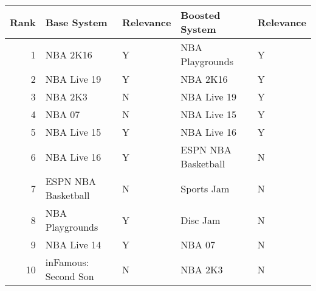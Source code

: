 \begin{tabular}{rllll}
\toprule
 Rank &          Base System & Relevance &      Boosted System & Relevance \\
\midrule
    1 &             NBA 2K16 &         Y &     NBA Playgrounds &         Y \\
    2 &          NBA Live 19 &         Y &            NBA 2K16 &         Y \\
    3 &              NBA 2K3 &         N &         NBA Live 19 &         Y \\
    4 &               NBA 07 &         N &         NBA Live 15 &         Y \\
    5 &          NBA Live 15 &         Y &         NBA Live 16 &         Y \\
    6 &          NBA Live 16 &         Y & ESPN NBA Basketball &         N \\
    7 &  ESPN NBA Basketball &         N &          Sports Jam &         N \\
    8 &      NBA Playgrounds &         Y &            Disc Jam &         N \\
    9 &          NBA Live 14 &         Y &              NBA 07 &         N \\
   10 & inFamous: Second Son &         N &             NBA 2K3 &         N \\
\bottomrule
\end{tabular}
